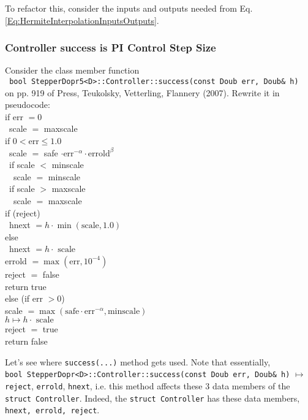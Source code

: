 \documentclass[10pt]{amsart}
\begin{document}
\begin{multicols*}{2}
To refactor this, consider the inputs and outputs needed from Eq. \ref{Eq:HermiteInterpolationInputsOutputs}.

\subsubsection{Controller success is PI Control Step Size}

Consider the class member function \\
\verb| bool StepperDopr5<D>::Controller::success(const Doub err, Doub& h)| \\
on pp. 919 of Press, Teukolsky, Vetterling, Flannery (2007). Rewrite it in pseudocode: \\

if err $ = 0$ \\
\quad \, scale $=$ maxscale \\
if $0 < \text{err} \leq 1.0$ \\
\quad \, scale $ =$ safe $\cdot \text{err}^{-\alpha} \cdot \text{errold}^{\beta}$ \\
\quad \, if scale $<$ minscale \\
\quad \, \quad \, scale $=$ minscale \\
\quad \, if scale $>$ maxscale \\
\quad \, \quad \, scale $=$ maxscale \\

if (reject) \\
\quad \, hnext $= h \cdot \min{(\text{scale}, 1.0)}$ \\
else \\
\quad \, hnext $= h\cdot \text{ scale }$ \\
errold $= \max{ (\text{err}, 10^{-4})}$ \\
reject $=$ false \\
return true \\

else (if err $> 0$) \\
scale $= \max{(\text{safe} \cdot \text{err}^{-\alpha}, \text{minscale})}$ \\
$h \mapsto h \cdot \text{ scale }$ \\
reject $=$ true \\
return false

Let's see where \verb|success(...)| method gets used. Note that essentially,  \\
\verb|bool StepperDopr<D>::Controller::success(const Doub err, Doub& h)| $\mapsto$ \verb|reject|, \verb|errold|, \verb|hnext|, i.e. this method affects these 3 data members of the \verb|struct Controller|. Indeed, the \verb|struct Controller| has these data members, \verb|hnext, errold, reject|.


\end{multicols*}
\end{document}
